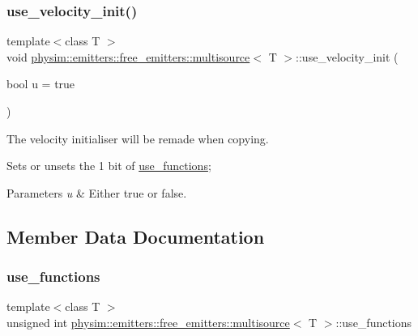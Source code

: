 \subsubsection{\texorpdfstring{use\+\_\+velocity\+\_\+init()}{use\_velocity\_init()}}
{\footnotesize\ttfamily template$<$class T $>$ \\
void \hyperlink{classphysim_1_1emitters_1_1free__emitters_1_1multisource}{physim\+::emitters\+::free\+\_\+emitters\+::multisource}$<$ T $>$\+::use\+\_\+velocity\+\_\+init (\begin{DoxyParamCaption}\item[{bool}]{u = {\ttfamily true} }\end{DoxyParamCaption})}



The velocity initialiser will be remade when copying. 

Sets or unsets the 1 bit of \hyperlink{classphysim_1_1emitters_1_1free__emitters_1_1multisource_a99bad5ac0fb5cb14652bbfd0c1f0eeff}{use\+\_\+functions}; 
\begin{DoxyParams}{Parameters}
{\em u} & Either true or false. \\
\hline
\end{DoxyParams}


\subsection{Member Data Documentation}
\mbox{\label{classphysim_1_1emitters_1_1free__emitters_1_1multisource_a99bad5ac0fb5cb14652bbfd0c1f0eeff}} 
\subsubsection{\texorpdfstring{use\+\_\+functions}{use\_functions}}
{\footnotesize\ttfamily template$<$class T $>$ \\
unsigned int \hyperlink{classphysim_1_1emitters_1_1free__emitters_1_1multisource}{physim\+::emitters\+::free\+\_\+emitters\+::multisource}$<$ T $>$\+::use\+\_\+functions\hspace{0.3cm}{\ttfamily [private]}}



